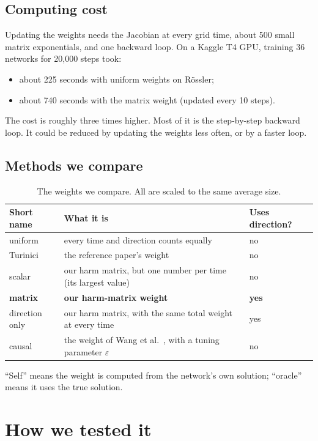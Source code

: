 \documentclass[11pt,a4paper]{article}
\begin{document}
\subsection{Computing cost}
Updating the weights needs the Jacobian at every grid time, about 500 small matrix
exponentials, and one backward loop. On a Kaggle T4 GPU, training 36 networks for 20{,}000
steps took:
\begin{itemize}
\item about 225 seconds with uniform weights on Rössler;
\item about 740 seconds with the matrix weight (updated every 10 steps).
\end{itemize}
The cost is roughly three times higher. Most of it is the step-by-step backward loop. It
could be reduced by updating the weights less often, or by a faster loop.

\subsection{Methods we compare}
\begin{table}[H]\centering
\caption{The weights we compare. All are scaled to the same average size.}
\begin{tabular}{lll}\toprule
Short name & What it is & Uses direction?\\\midrule
uniform & every time and direction counts equally & no\\
Turinici & the reference paper's weight & no\\
scalar & our harm matrix, but one number per time (its largest value) & no\\
\textbf{matrix} & \textbf{our harm-matrix weight} & \textbf{yes}\\
direction only & our harm matrix, with the same total weight at every time & yes\\
causal & the weight of Wang et al.\ \cite{wang2022}, with a tuning parameter $\varepsilon$ & no\\\bottomrule
\end{tabular}
\end{table}
\noindent ``Self'' means the weight is computed from the network's own solution; ``oracle''
means it uses the true solution.

\section{How we tested it}
\end{document}
